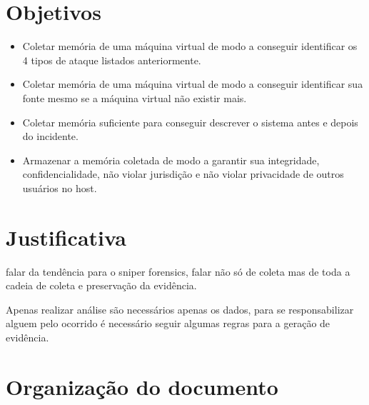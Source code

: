 \documentclass[
	12pt,				%
	openright,			%
	oneside,			%
	a4paper,			%
	english,			%
	brazil,				%
	]{abntex2}
\newcommand{\marcos}[1]{{\color{blue}{MARCOS: #1}}}
\begin{document}
\section{Objetivos}
\label{chp:intro-objetivos}

\marcos{Apresente aqui quais são os seus objetivos, ou seja, como você irá resolver o problema em questão.}

\begin{itemize}
 \item Coletar memória de uma máquina virtual de modo a conseguir identificar os 4 tipos de ataque listados anteriormente.
 \item Coletar memória de uma máquina virtual de modo a conseguir identificar sua fonte mesmo se a máquina virtual não existir mais.
 \item Coletar memória suficiente para conseguir descrever o sistema antes e depois do incidente.
 \item Armazenar a memória coletada de modo a garantir sua integridade, confidencialidade, não violar jurisdição e não violar privacidade de outros usuários no host.\\
\end{itemize}

\section{Justificativa}
\label{chp:intro-justificativa}

\marcos{Apresente aqui o porquê da forma como você vai resolver o problema ser interessante, bem como possíveis alternativas e o porquê das alternativas não serem tão interessantes quanto a sua abordagem.}

falar da tendência para o sniper forensics, falar não só de coleta mas de toda a cadeia de coleta e preservação da evidência. 

Apenas realizar análise são necessários apenas os dados, para se responsabilizar alguem pelo ocorrido é necessário seguir algumas regras para a geração de evidência.

\section{Organização do documento}
\label{chp:intro-organizacao}
\end{document}
